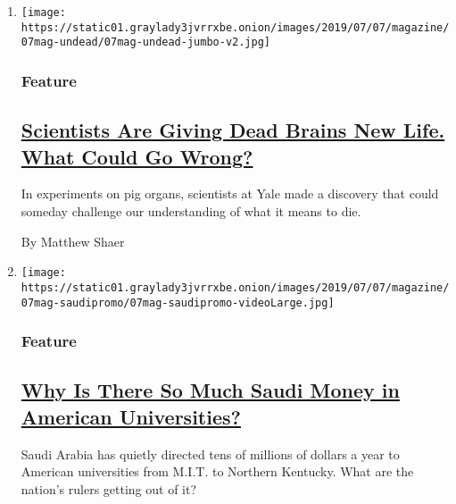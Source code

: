 \begin{enumerate}
\def\labelenumi{\arabic{enumi}.}
\item
  \texttt{[image: https://static01.graylady3jvrrxbe.onion/images/2019/07/07/magazine/07mag-undead/07mag-undead-jumbo-v2.jpg]}

  \hypertarget{feature}{%
  \subsubsection{Feature}\label{feature}}

  \hypertarget{scientists-are-giving-dead-brains-new-life-what-could-go-wrong}{%
  \subsection{\texorpdfstring{\href{/2019/07/02/magazine/dead-pig-brains-reanimation.html}{Scientists
  Are Giving Dead Brains New Life. What Could Go
  Wrong?}}{Scientists Are Giving Dead Brains New Life. What Could Go Wrong?}}\label{scientists-are-giving-dead-brains-new-life-what-could-go-wrong}}

  In experiments on pig organs, scientists at Yale made a discovery that
  could someday challenge our understanding of what it means to die.

  By Matthew Shaer
\item
  \texttt{[image: https://static01.graylady3jvrrxbe.onion/images/2019/07/07/magazine/07mag-saudipromo/07mag-saudipromo-videoLarge.jpg]}

  \hypertarget{feature-1}{%
  \subsubsection{Feature}\label{feature-1}}

  \hypertarget{why-is-there-so-much-saudi-money-in-american-universities}{%
  \subsection{\texorpdfstring{\href{/2019/07/03/magazine/saudi-arabia-american-universities.html}{Why
  Is There So Much Saudi Money in American
  Universities?}}{Why Is There So Much Saudi Money in American Universities?}}\label{why-is-there-so-much-saudi-money-in-american-universities}}

  Saudi Arabia has quietly directed tens of millions of dollars a year
  to American universities from M.I.T. to Northern Kentucky. What are
  the nation's rulers getting out of it?


\end{enumerate}
